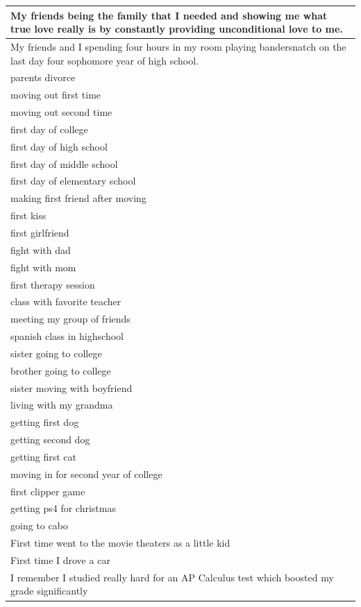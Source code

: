 \documentclass[
  .7em,
  letterpaper,
  DIV=11,
  numbers=noendperiod]{scrartcl}
\begin{document}
\begin{table}
\begin{tabular}{l}
\hline
My friends being the family that I needed and showing me what true love really is by constantly providing unconditional love to me.\\
\hline
My friends and I spending four hours in my room playing bandersnatch on the last day four sophomore year of high school.\\
\hline
parents divorce\\
\hline
moving out first time\\
\hline
moving out second time\\
\hline
first day of college\\
\hline
first day of high school\\
\hline
first day of middle school\\
\hline
first day of elementary school\\
\hline
making first friend after moving\\
\hline
first kiss\\
\hline
first girlfriend\\
\hline
fight with dad\\
\hline
fight with mom\\
\hline
first therapy session\\
\hline
class with favorite teacher\\
\hline
meeting my group of friends\\
\hline
spanish class in highschool\\
\hline
sister going to college\\
\hline
brother going to college\\
\hline
sister moving with boyfriend\\
\hline
living with my grandma\\
\hline
getting first dog\\
\hline
getting second dog\\
\hline
getting first cat\\
\hline
moving in for second year of college\\
\hline
first clipper game\\
\hline
getting ps4 for christmas\\
\hline
going to cabo\\
\hline
First time went to the movie theaters as a little kid\\
\hline
First time I drove a car\\
\hline
I remember I studied really hard for an AP Calculus test which boosted my grade significantly\\

\end{tabular}
\end{table}
\end{document}
